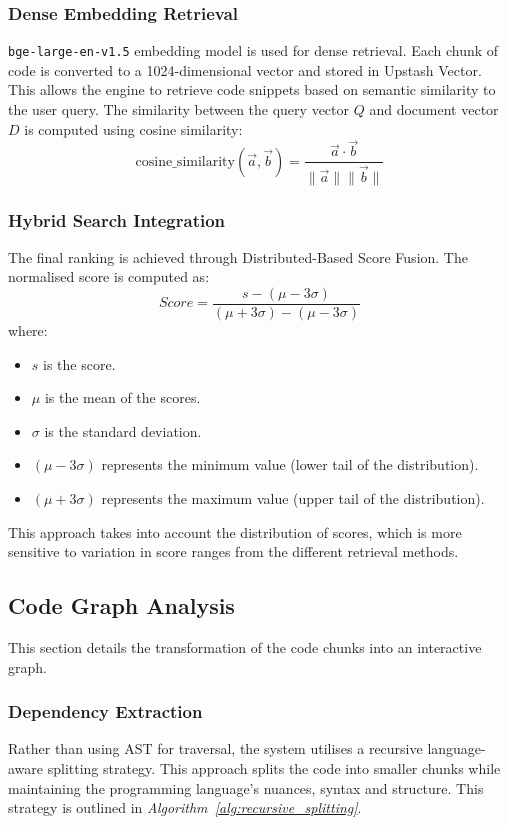 \subsubsection{Dense Embedding Retrieval}
\texttt{bge-large-en-v1.5} embedding model is used for dense retrieval. Each chunk of code is converted to a 1024-dimensional vector and stored in Upstash Vector. This allows the engine to retrieve code snippets based on semantic similarity to the user query. The similarity between the query vector \( Q \) and document vector \( D \) is computed using cosine similarity:
\[
\text{cosine\_similarity}(\vec{a}, \vec{b}) = \frac{\vec{a} \cdot \vec{b}}{\|\vec{a}\| \|\vec{b}\|}
\]

\subsubsection{Hybrid Search Integration}
The final ranking is achieved through Distributed-Based Score Fusion. The normalised score is computed as:
\[
Score = \frac{s - (\mu - 3\sigma)}{(\mu + 3\sigma) - (\mu - 3\sigma)}
\]
where:
\begin{itemize}
    \item $s$ is the score.
    \item $\mu$ is the mean of the scores.
    \item $\sigma$ is the standard deviation.
    \item $(\mu - 3\sigma)$ represents the minimum value (lower tail of the distribution).
    \item $(\mu + 3\sigma)$ represents the maximum value (upper tail of the distribution).
\end{itemize}
This approach takes into account the distribution of scores, which is more sensitive to variation in score ranges from the different retrieval methods.

\subsection{Code Graph Analysis}
This section details the transformation of the code chunks into an interactive graph.
\subsubsection{Dependency Extraction}
Rather than using AST for traversal, the system utilises a recursive language-aware splitting strategy. This approach splits the code into smaller chunks while maintaining the programming language's nuances, syntax and structure. This strategy is outlined in \textit{Algorithm~\ref{alg:recursive_splitting}}.

